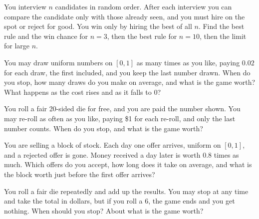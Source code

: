 \begin{question}\label{iq:iv1:optimal-stopping:5}
You interview $n$ candidates in random order. After each interview you can compare the candidate only with those already seen, and you must hire on the spot or reject for good. You win only by hiring the best of all $n$. Find the best rule and the win chance for $n = 3$, then the best rule for $n = 10$, then the limit for large $n$.
\end{question}

\begin{question}\label{iq:iv1:optimal-stopping:6}
You may draw uniform numbers on $[0, 1]$ as many times as you like, paying $0.02$ for each draw, the first included, and you keep the last number drawn. When do you stop, how many draws do you make on average, and what is the game worth? What happens as the cost rises and as it falls to 0?
\end{question}

\begin{question}\label{iq:iv1:optimal-stopping:7}
You roll a fair 20-sided die for free, and you are paid the number shown. You may re-roll as often as you like, paying \$1 for each re-roll, and only the last number counts. When do you stop, and what is the game worth?
\end{question}

\begin{question}\label{iq:iv1:optimal-stopping:8}
You are selling a block of stock. Each day one offer arrives, uniform on $[0, 1]$, and a rejected offer is gone. Money received a day later is worth $0.8$ times as much. Which offers do you accept, how long does it take on average, and what is the block worth just before the first offer arrives?
\end{question}

\begin{question}\label{iq:iv1:optimal-stopping:9}
You roll a fair die repeatedly and add up the results. You may stop at any time and take the total in dollars, but if you roll a 6, the game ends and you get nothing. When should you stop? About what is the game worth?
\end{question}

